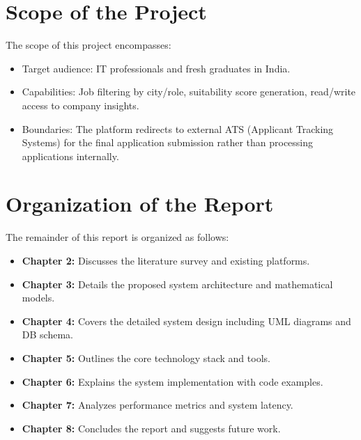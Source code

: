 \section{Scope of the Project}
The scope of this project encompasses:
\begin{itemize}
    \item Target audience: IT professionals and fresh graduates in India.
    \item Capabilities: Job filtering by city/role, suitability score generation, read/write access to company insights.
    \item Boundaries: The platform redirects to external ATS (Applicant Tracking Systems) for the final application submission rather than processing applications internally.
\end{itemize}

\section{Organization of the Report}
The remainder of this report is organized as follows:
\begin{itemize}
    \item \textbf{Chapter 2:} Discusses the literature survey and existing platforms.
    \item \textbf{Chapter 3:} Details the proposed system architecture and mathematical models.
    \item \textbf{Chapter 4:} Covers the detailed system design including UML diagrams and DB schema.
    \item \textbf{Chapter 5:} Outlines the core technology stack and tools.
    \item \textbf{Chapter 6:} Explains the system implementation with code examples.
    \item \textbf{Chapter 7:} Analyzes performance metrics and system latency.
    \item \textbf{Chapter 8:} Concludes the report and suggests future work.
\end{itemize}
